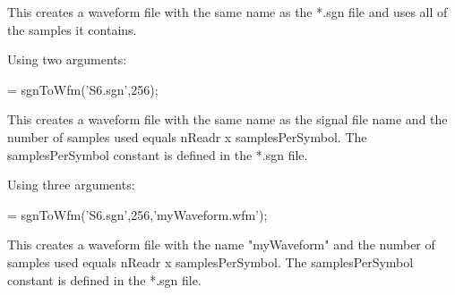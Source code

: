 \noindent
This creates a waveform file with the same name as the *.sgn file and uses all of the samples it contains.
\bigskip

\noindent
Using two arguments:

\bigskip

 = sgnToWfm('S6.sgn',256);
\bigskip

\noindent
This creates a waveform file with the same name as the signal file name and the number of samples used equals nReadr x samplesPerSymbol. The samplesPerSymbol constant is defined in the *.sgn file.
\bigskip

\noindent
Using three arguments:

\bigskip

 = sgnToWfm('S6.sgn',256,'myWaveform.wfm');
\bigskip

\noindent
This creates a waveform file with the name "myWaveform" and the number of samples used equals nReadr x samplesPerSymbol. The samplesPerSymbol constant is defined in the *.sgn file.

